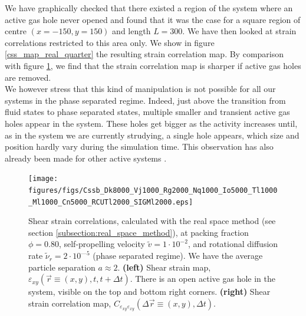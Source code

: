 \documentclass[class=report, float=false, crop=false]{standalone}
\begin{document}
We have graphically checked that there existed a region of the system where an active gas hole never opened and found that it was the case for a square region of centre $(x=-150, y=150)$ and length $L=300$. We have then looked at strain correlations restricted to this area only. We show in figure \ref{css_map_real_quarter} the resulting strain correlation map. By comparison with figure \ref{css_map_real}, we find that the strain correlation map is sharper if active gas holes are removed.\\

We however stress that this kind of manipulation is not possible for all our systems in the phase separated regime. Indeed, just above the transition from fluid states to phase separated states, multiple smaller and transient active gas holes appear in the system. These holes get bigger as the activity increases until, as in the system we are currently strudying, a single hole appears, which size and position hardly vary during the simulation time. This observation has also already been made for other active systems \cite{wysocki2014cooperative, levis2014clustering}.\\

\begin{figure}[H]
\centering
\texttt{[image: figures/figs/Cssb\_Dk8000\_Vj1000\_Rg2000\_Nq1000\_Io5000\_Tl1000\_Ml1000\_Cn5000\_RCUTl2000\_SIGMl2000.eps]}
\vspace{-1cm}
\caption{Shear strain correlations, calculated with the real space method (see section \ref{subsection:real_space_method}), at packing fraction $\phi = 0.80$, self-propelling velocity $\tilde{v} = 1\cdot10^{-2}$, and rotational diffusion rate $\tilde{\nu}_r = 2\cdot10^{—5}$ (phase separated regime). We have the average particle separation $a \approx 2$. \textbf{(left)} Shear strain map, $\varepsilon_{xy}(\vec{r} \equiv (x, y), t, t + \Delta t)$. There is an open active gas hole in the system, visible on the top and bottom right corners. \textbf{(right)} Shear strain correlation map, $C_{\varepsilon_{xy}\varepsilon_{xy}}(\Delta\vec{r} \equiv (x, y), \Delta t)$.}
\label{css_map_real}
\end{figure}
\end{document}

